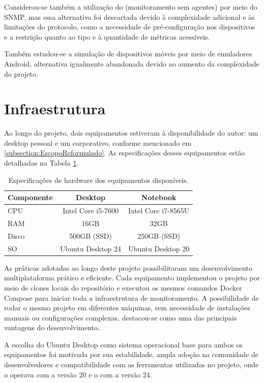 Considerou-se também a utilização do  (monitoramento sem agentes) por meio do SNMP, mas essa alternativa foi descartada devido à complexidade adicional e às limitações do protocolo, como a necessidade de pré-configuração nos dispositivos e a restrição quanto ao tipo e à quantidade de métricas acessíveis.

Também estudou-se a simulação de dispositivos móveis por meio de emuladores Android, alternativa igualmente abandonada devido ao aumento da complexidade do projeto.


\section{Infraestrutura}
\label{section:Infraestrutura}

Ao longo do projeto, dois equipamentos estiveram à disponibilidade do autor: um desktop pessoal e um  corporativo, conforme mencionado em \ref{subsection:EscopoReformulado}. As especificações desses equipamentos estão detalhadas na Tabela \ref{tab:available-hardware}.

\begin{table}[H]
\centering
\caption{Especificações de hardware dos equipamentos disponíveis.}
\label{tab:available-hardware}
\begin{tabular}{lcc}
\toprule
\textbf{Componente} & \textbf{Desktop} & \textbf{Notebook} \\
\midrule
CPU   & Intel Core i5-7600   & Intel Core i7-8565U \\
RAM   & 16GB                 & 32GB                \\
Disco & 500GB (SSD)            & 250GB (SSD)          \\
SO & Ubuntu Desktop 24 & Ubuntu Desktop 20 \\
\bottomrule
\end{tabular}
\end{table}

As práticas adotadas ao longo deste projeto possibilitaram um desenvolvimento multiplataforma prático e eficiente. Cada equipamento implementou o projeto por meio de clones locais do repositório e executou os mesmos comandos Docker Compose para iniciar toda a infraestrutura de monitoramento. A possibilidade de rodar o mesmo projeto em diferentes máquinas, sem necessidade de instalações manuais ou configurações complexas, destacou-se como uma das principais vantagens do desenvolvimento.

A escolha do Ubuntu Desktop como sistema operacional base para ambos os equipamentos foi motivada por sua estabilidade, ampla adoção na comunidade de desenvolvedores e compatibilidade com as ferramentas utilizadas no projeto, onde o  operava com a versão 20 e o  com a versão 24.

